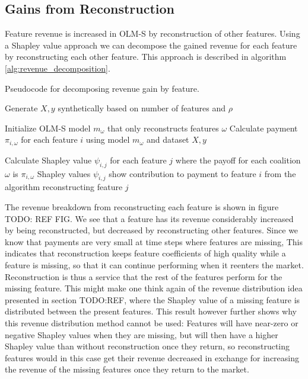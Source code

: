 
\subsection{Gains from Reconstruction}

Feature revenue is increased in OLM-S by reconstruction of other features.
Using a Shapley value approach we can decompose the gained revenue for each
feature by reconstructing each other feature. This approach is described in
algorithm \ref{alg:revenue_decomposition}.


\begin{algorithm}
  \caption{Pseudocode for decomposing revenue gain by feature.}\label{alg:revenue_decomposition}
  \begin{algorithmic}
    \State Generate $X,y$ synthetically based on number of features and $\rho$

    \State Initialize OLM-S model $m_{\omega}$ that only reconstructs
    features $\omega$
    \State Calculate payment $\pi_{i,\omega}$ for each feature $i$ using
    model $m_{\omega}$ and dataset $X,y$
    \EndFor

    \State Calculate Shapley value $\psi_{i,j}$ for each feature $j$ where
    the payoff for each coalition $\omega$ is $\pi_{i,\omega}$
    \EndFor
    \State Shapley values $\psi_{i,j}$ show contribution to payment to feature
    $i$ from the algorithm reconstructing feature $j$
  \end{algorithmic}
\end{algorithm}

The revenue breakdown from reconstructing each feature is shown in figure TODO:
REF FIG. We see that a feature has its revenue considerably increased by being
reconstructed, but decreased by reconstructing other features. Since we know
that payments are very small at time steps where features are missing, This
indicates that reconstruction keeps feature coefficients of high quality while
a feature is missing, so that it can continue performing when it reenters the
market. Reconstruction is thus a service that the rest of the features perform
for the missing feature. This might make one think again of the revenue
distribution idea presented in section TODO:REF, where the Shapley value of a
missing feature is distributed between the present features. This result
however further shows why this revenue distribution method cannot be used:
Features will have near-zero or negative Shapley values when they are missing,
but will then have a higher Shapley value than without reconstruction once they
return, so reconstructing features would in this case get their revenue
decreased in exchange for increasing the revenue of the missing features once
they return to the market.


